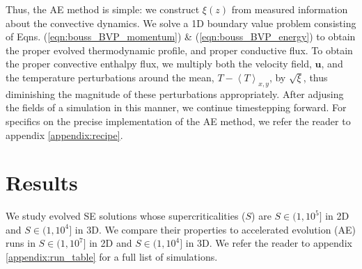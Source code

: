 \documentclass[aps, pre, onecolumn, nofootinbib, notitlepage, groupedaddress, amsfonts, amssymb, amsmath, longbibliography]{revtex4-1}
\newcommand{\angles}[1]{\ensuremath{\left\langle #1 \right\rangle}}
\begin{document}
Thus, the AE method is simple: we construct $\xi(z)$ from measured information about
the convective dynamics. We solve a 1D boundary value problem consisting of
Eqns. (\ref{eqn:bouss_BVP_momentum}) \& (\ref{eqn:bouss_BVP_energy})
to obtain the proper evolved thermodynamic profile, and proper conductive flux.
To obtain the proper convective enthalpy flux, we multiply both the velocity field,
$\bm{u}$, and the temperature perturbations around the mean, $T - \angles{T}_{x,y}$,
by $\sqrt{\xi}$, thus diminishing the magnitude of these perturbations appropriately.
After adjusing the fields of a simulation in this manner, we continue timestepping forward.
For specifics on the precise implementation of the AE method, we refer
the reader to appendix \ref{appendix:recipe}.


\vspace{-0.5cm}
\section{Results}
\label{sec:results}
We study evolved SE solutions whose supercriticalities ($S$) are 
$S \in (1, 10^5]$ in 2D and $S \in (1, 10^4]$ in
3D. We compare their properties to
accelerated evolution (AE) runs in $S \in (1, 10^7]$ in 2D and
$S \in (1, 10^4]$ in 3D.
We refer the reader to appendix \ref{appendix:run_table} for a full list of
simulations.
\end{document}
